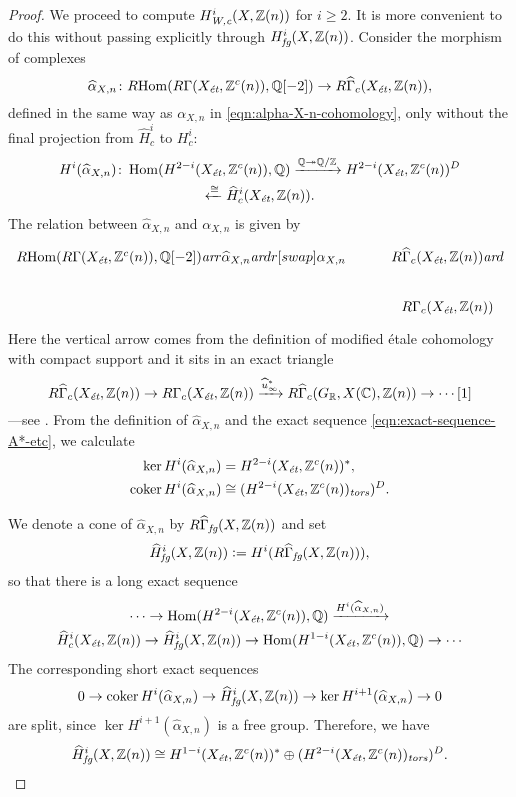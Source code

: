 \documentclass[draft]{article}
\DeclareMathOperator{\coker}{coker}
\DeclareMathOperator{\Hom}{Hom}
\newcommand{\CC}{\mathbb{C}}
\newcommand{\QQ}{\mathbb{Q}}
\newcommand{\RR}{\mathbb{R}}
\newcommand{\ZZ}{\mathbb{Z}}
\newcommand{\ar}{\text{\it ar}}
\newcommand{\et}{\text{\it \'{e}t}}
\newcommand{\fg}{\text{\it fg}}
\newcommand{\tors}{\text{\it tors}}
\newcommand{\Wc}{\text{\it W,c}}
\newcommand{\dfn}{\mathrel{\mathop:}=}
\newcommand{\RHom}{R\!\Hom}
\theoremstyle{myplain}
\theoremstyle{mydefinition}
\begin{document}
\begin{proof}
  \vspace{1em}

  We proceed to compute $H^i_\Wc (X, \ZZ(n))$ for $i \ge 2$. It is more
  convenient to do this without passing explicitly through
  $H^i_\fg (X, \ZZ(n))$. Consider the morphism of complexes
  \[ \widehat{\alpha}_{X,n}\colon
    \RHom (R\Gamma (X_\et, \ZZ^c(n)), \QQ[-2]) \to
    R\widehat{\Gamma}_c (X_\et, \ZZ(n)), \]
  defined in the same way as $\alpha_{X,n}$ in \eqref{eqn:alpha-X-n-cohomology},
  only without the final projection from $\widehat{H}^i_c$ to $H^i_c$:
  \begin{multline*}
    H^i (\widehat{\alpha}_{X,n})\colon \Hom (H^{2-i} (X_\et, \ZZ^c(n)), \QQ)
    \xrightarrow{\QQ \twoheadrightarrow \QQ/\ZZ}
    H^{2-i} (X_\et, \ZZ^c(n))^D \\
    \xleftarrow{\cong} \widehat{H}^i_c (X_\et, \ZZ(n)).
  \end{multline*}
  The relation between $\widehat{\alpha}_{X,n}$ and $\alpha_{X,n}$
  is given by
  \[ \begin{tikzcd}
      \RHom (R\Gamma (X_\et, \ZZ^c(n)), \QQ[-2]) \ar{r}{\widehat{\alpha}_{X,n}}\ar{dr}[swap]{\alpha_{X,n}} & R\widehat{\Gamma}_c (X_\et, \ZZ(n)) \ar{d} \\
      & R\Gamma_c (X_\et, \ZZ(n))
    \end{tikzcd} \]
  Here the vertical arrow comes from the definition of modified \'{e}tale
  cohomology with compact support and it sits in an exact triangle
  \[ R\widehat{\Gamma}_c (X_\et, \ZZ(n)) \to
    R\Gamma_c (X_\et, \ZZ(n)) \xrightarrow{\widehat{u}^*_\infty}
    R\widehat{\Gamma}_c (G_\RR, X(\CC), \ZZ(n)) \to \cdots [1] \]
  ---see \cite[Lemma~6.14]{Flach-Morin-2018}.
  From the definition of $\widehat{\alpha}_{X,n}$ and the exact sequence
  \eqref{eqn:exact-sequence-A*-etc}, we calculate
  \begin{align*}
    \ker H^i (\widehat{\alpha}_{X,n}) & = H^{2-i} (X_\et, \ZZ^c(n))^*, \\
    \coker H^i (\widehat{\alpha}_{X,n}) & \cong (H^{2-i} (X_\et, \ZZ^c (n))_\tors)^D.
  \end{align*}

  We denote a cone of $\widehat{\alpha}_{X,n}$ by
  $R\widehat{\Gamma}_\fg (X, \ZZ(n))$ and set
  $$\widehat{H}^i_\fg (X, \ZZ(n)) \dfn H^i (R\widehat{\Gamma}_\fg (X, \ZZ(n))),$$
  so that there is a long exact sequence
  \begin{multline*}
    \cdots \to \Hom (H^{2-i} (X_\et, \ZZ^c (n)), \QQ) \xrightarrow{H^i (\widehat{\alpha}_{X,n})} \\
    \widehat{H}^i_c (X_\et, \ZZ(n)) \to
    \widehat{H}^i_\fg (X, \ZZ(n)) \to
    \Hom (H^{1-i} (X_\et, \ZZ^c (n)), \QQ) \to \cdots
  \end{multline*}
  The corresponding short exact sequences
  \[ 0 \to \coker H^i (\widehat{\alpha}_{X,n}) \to
    \widehat{H}^i_\fg (X, \ZZ(n)) \to
    \ker H^{i+1} (\widehat{\alpha}_{X,n}) \to 0 \]
  are split, since $\ker H^{i+1} (\widehat{\alpha}_{X,n})$ is a free
  group. Therefore, we have
  \[ \widehat{H}^i_\fg (X, \ZZ(n)) \cong
    H^{1-i} (X_\et, \ZZ^c(n))^*
    \oplus
    (H^{2-i} (X_\et, \ZZ^c (n))_\tors)^D. \]


\end{proof}
\end{document}

